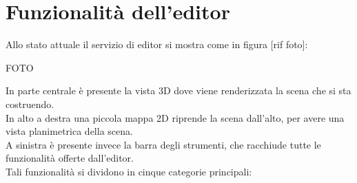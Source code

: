 \section{Funzionalità dell'editor}
\label{sec:chapter_creazione_scena_funzionalita_editor}

Allo stato attuale il servizio di editor si mostra come in figura [rif foto]:

FOTO

In parte centrale è presente la vista 3D dove viene renderizzata la scena che si sta costruendo.
\\ 
In alto a destra una piccola mappa 2D riprende la scena dall’alto, per avere una vista planimetrica della scena.
\\
A sinistra è presente invece la barra degli strumenti, che racchiude tutte le funzionalità offerte dall’editor.
\\
Tali funzionalità si dividono in cinque categorie principali:
